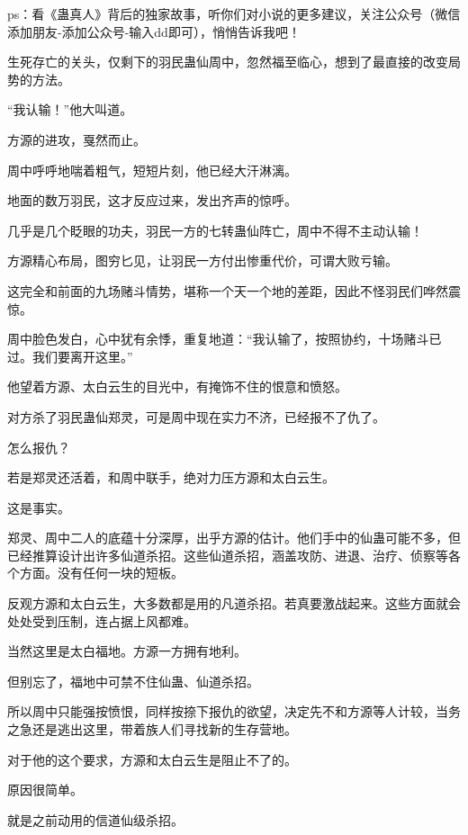 
\begin{this_body}



ps：看《蛊真人》背后的独家故事，听你们对小说的更多建议，关注公众号（微信添加朋友-添加公众号-输入dd即可），悄悄告诉我吧！

生死存亡的关头，仅剩下的羽民蛊仙周中，忽然福至临心，想到了最直接的改变局势的方法。

“我认输！”他大叫道。

方源的进攻，戛然而止。

周中呼呼地喘着粗气，短短片刻，他已经大汗淋漓。

地面的数万羽民，这才反应过来，发出齐声的惊呼。

几乎是几个眨眼的功夫，羽民一方的七转蛊仙阵亡，周中不得不主动认输！

方源精心布局，图穷匕见，让羽民一方付出惨重代价，可谓大败亏输。

这完全和前面的九场赌斗情势，堪称一个天一个地的差距，因此不怪羽民们哗然震惊。

周中脸色发白，心中犹有余悸，重复地道：“我认输了，按照协约，十场赌斗已过。我们要离开这里。”

他望着方源、太白云生的目光中，有掩饰不住的恨意和愤怒。

对方杀了羽民蛊仙郑灵，可是周中现在实力不济，已经报不了仇了。

怎么报仇？

若是郑灵还活着，和周中联手，绝对力压方源和太白云生。

这是事实。

郑灵、周中二人的底蕴十分深厚，出乎方源的估计。他们手中的仙蛊可能不多，但已经推算设计出许多仙道杀招。这些仙道杀招，涵盖攻防、进退、治疗、侦察等各个方面。没有任何一块的短板。

反观方源和太白云生，大多数都是用的凡道杀招。若真要激战起来。这些方面就会处处受到压制，连占据上风都难。

当然这里是太白福地。方源一方拥有地利。

但别忘了，福地中可禁不住仙蛊、仙道杀招。

所以周中只能强按愤恨，同样按捺下报仇的欲望，决定先不和方源等人计较，当务之急还是逃出这里，带着族人们寻找新的生存营地。

对于他的这个要求，方源和太白云生是阻止不了的。

原因很简单。

就是之前动用的信道仙级杀招。


\end{this_body}
